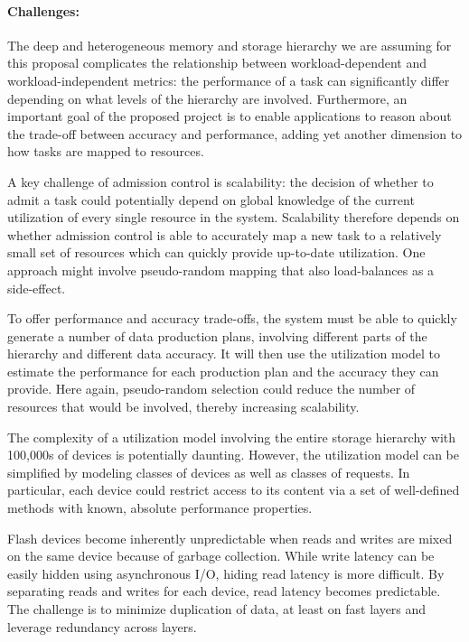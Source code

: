 \paragraph{Challenges:}
The deep and heterogeneous memory and storage hierarchy we are assuming for
this proposal complicates the relationship between workload-dependent and
workload-independent metrics: the performance of a task can significantly
differ depending on what levels of the hierarchy are involved. Furthermore, an
important goal of the proposed project is to enable applications to reason
about the trade-off between accuracy and performance, adding yet another
dimension to how tasks are mapped to resources.

\begin{tightItemize}

\item A key challenge of admission control is scalability: the
decision of whether to admit a task could potentially depend on
global knowledge of the current utilization of every single resource
in the system. Scalability therefore depends on whether admission
control is able to accurately map a new task to a relatively small
set of resources which can quickly provide up-to-date utilization.
One approach might involve pseudo-random mapping that also load-balances
as a side-effect.

\item To offer performance and accuracy trade-offs, the system must be able
to quickly generate a number of data production plans, involving
different parts of the hierarchy and different data accuracy.
It will then use the utilization model to estimate the performance for
each production plan and the accuracy they can provide. Here
again, pseudo-random selection could reduce the number of resources
that would be involved, thereby increasing scalability.

\item The complexity of a utilization model involving the entire
storage hierarchy with 100,000s of devices is potentially daunting.
However, the utilization model can be simplified by modeling classes
of devices as well as classes of requests. In particular, each
device could restrict access to its content via a set of well-defined
methods with known, absolute performance properties.

\item Flash devices become inherently unpredictable when reads and
writes are mixed on the same device because of garbage collection.
While write latency can be easily hidden using asynchronous I/O,
hiding read latency is more difficult. By separating reads and
writes for each device, read latency becomes predictable. The
challenge is to minimize duplication of data, at least on fast
layers and leverage redundancy across layers.

\end{tightItemize}




